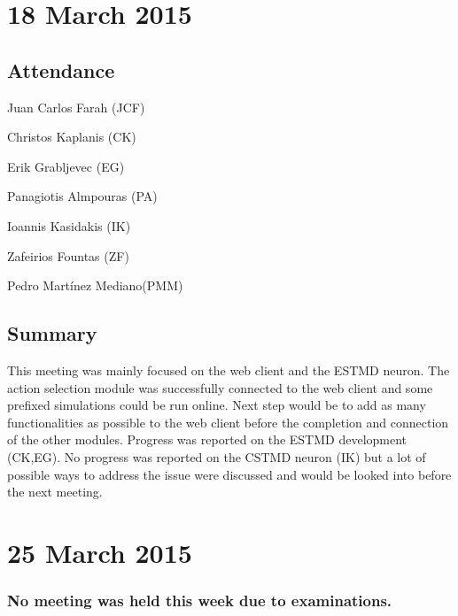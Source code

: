 \documentclass[a4paper,11pt]{article}
\begin{document}
\maketitle
\section*{18 March 2015}
\subsection*{Attendance}
\begin{compactenum}
\item Juan Carlos Farah (JCF)
\item Christos Kaplanis (CK)
\item Erik Grabljevec (EG)
\item Panagiotis Almpouras (PA)
\item Ioannis Kasidakis (IK)
\item Zafeirios Fountas (ZF)
\item Pedro Martínez Mediano(PMM)
\end{compactenum}

\subsection*{Summary}
This meeting was mainly focused on the web client and the ESTMD neuron. The action selection module was successfully connected to the web client and some prefixed simulations could be run online. Next step would be to add as many functionalities as possible to the web client before the completion and connection of the other modules. Progress was reported on the ESTMD development (CK,EG). No progress was reported on the CSTMD neuron (IK) but a lot of possible ways to address the issue were discussed and would be looked into before the next meeting.

\maketitle
\section*{25 March 2015}
\subsubsection*{No meeting was held this week due to examinations.}

\maketitle
\end{document}

